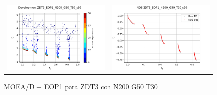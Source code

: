 \begin{figure}[H]
\begin{tabular}{c c}
    \includegraphics[scale=0.5]{figures/ZDT3_EOP1_N200_G50_T30/s99_dev.png} &
    \includegraphics[scale=0.5]{figures/ZDT3_EOP1_N200_G50_T30/s99_nds.png}\\
    \end{tabular}
    \caption{MOEA/D + EOP1 para ZDT3 con N200 G50 T30 }
    \label{fig:6}
\end{figure}


